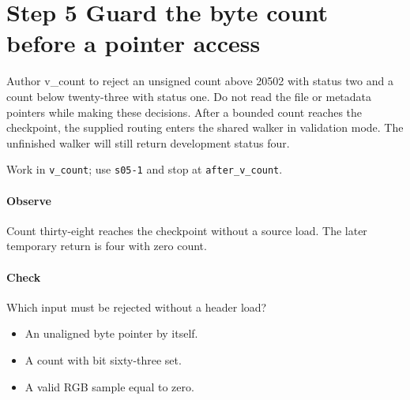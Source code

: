\section{Step 5 Guard the byte count before a pointer access}\label{qoi-s05}
Author v\_count to reject an unsigned count above 20502 with status two and a count below twenty-three with status one. Do not read the file or metadata pointers while making these decisions. After a bounded count reaches the checkpoint, the supplied routing enters the shared walker in validation mode. The unfinished walker will still return development status four.

Work in \texttt{v\_count}; use \texttt{s05-1} and stop at \texttt{after\_v\_count}.

\paragraph{Observe} Count thirty-eight reaches the checkpoint without a source load. The later temporary return is four with zero count.

\paragraph{Check} Which input must be rejected without a header load?
\begin{itemize}
\item[A.] An unaligned byte pointer by itself.
\item[B.] A count with bit sixty-three set.
\item[C.] A valid RGB sample equal to zero.
\end{itemize}
